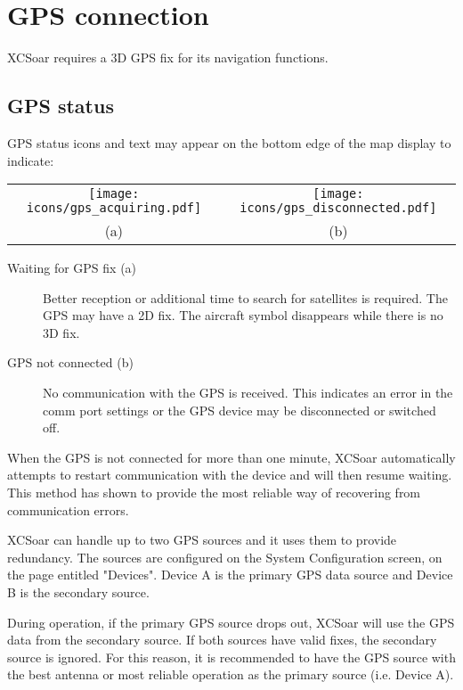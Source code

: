 \section{GPS connection}

XCSoar requires a 3D GPS fix for its navigation functions.

\subsection*{GPS status}

GPS status icons and text may appear on the bottom edge of the
map display to indicate:

\begin{tabular}{c c}%
\texttt{[image: icons/gps\_acquiring.pdf]} & \texttt{[image: icons/gps\_disconnected.pdf]}\\
(a) & (b)
\end{tabular}

\begin{description}
\item[Waiting for GPS fix (a)]  Better reception
  or additional time to search for satellites is required. The GPS may have a 2D fix.
  The aircraft symbol disappears while there is no 3D fix.
\item[GPS not connected (b)]  No communication with the GPS is received.
  This indicates an error in the comm port settings or the GPS device may
  be disconnected or switched off.
\end{description}

When the GPS is not connected for more than one minute, XCSoar automatically 
attempts to restart communication with the device and will then resume waiting. 
This method has shown to provide the most reliable way of recovering from 
communication errors.

XCSoar can handle up to two GPS sources and it uses them to provide redundancy. 
The sources are configured on the System Configuration screen, on the page 
entitled "Devices".  Device A is the primary GPS data source and Device B is 
the secondary source.

During operation, if the primary GPS source drops out, XCSoar will use the GPS 
data from the secondary source.  If both sources have valid fixes, the secondary 
source is ignored.  For this reason, it is recommended to have the GPS source 
with the best antenna or most reliable operation as the primary source (i.e. Device A).

